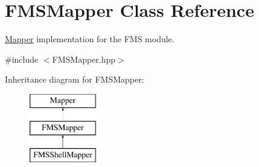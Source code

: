 \hypertarget{classFMSMapper}{
\section{FMSMapper Class Reference}
\label{classFMSMapper}
}


\hyperlink{classMapper}{Mapper} implementation for the FMS module.  




{\ttfamily \#include $<$FMSMapper.hpp$>$}

Inheritance diagram for FMSMapper:\begin{figure}[H]
\begin{center}
\leavevmode
\includegraphics[height=3.000000cm]{classFMSMapper}
\end{center}
\end{figure}
